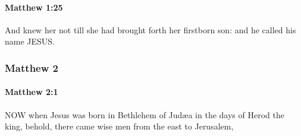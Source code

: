 		\paragraph{Matthew 1:25} %
			\label{MATTHEW-1-25}

			And knew her not till she had brought forth her firstborn son: and he called his name JESUS.

			\begin{framed}
			\scriptsize
				\begin{compactdesc}
					\item[SBLG] 
				\end{compactdesc}
			\end{framed}

	\subsubsection{Matthew 2} %
		\label{MATTHEW-2}
		
		\paragraph{Matthew 2:1} %
			\label{MATTHEW-2-1}

			NOW when Jesus was born in Bethlehem of Judæa in the days of Herod the king, behold, there came wise men from the east to Jerusalem,

